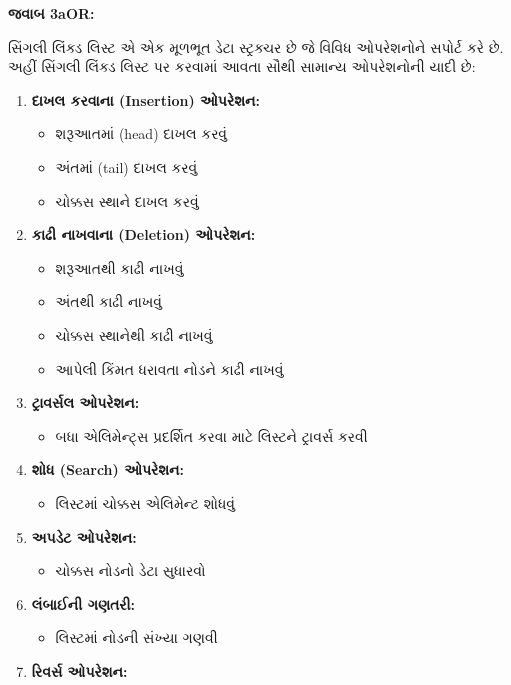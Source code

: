 \textbf{જવાબ 3aOR:}

સિંગલી લિંક્ડ લિસ્ટ એ એક મૂળભૂત ડેટા સ્ટ્રક્ચર છે જે વિવિધ ઓપરેશનોને સપોર્ટ કરે છે. અહીં
સિંગલી લિંક્ડ લિસ્ટ પર કરવામાં આવતા સૌથી સામાન્ય ઓપરેશનોની યાદી છે:

\begin{enumerate}
\def\labelenumi{\arabic{enumi}.}
\tightlist
\item
  \textbf{દાખલ કરવાના (Insertion) ઓપરેશન:}

  \begin{itemize}
  \tightlist
  \item
    શરૂઆતમાં (head) દાખલ કરવું
  \item
    અંતમાં (tail) દાખલ કરવું
  \item
    ચોક્કસ સ્થાને દાખલ કરવું
  \end{itemize}
\item
  \textbf{કાઢી નાખવાના (Deletion) ઓપરેશન:}

  \begin{itemize}
  \tightlist
  \item
    શરૂઆતથી કાઢી નાખવું
  \item
    અંતથી કાઢી નાખવું
  \item
    ચોક્કસ સ્થાનેથી કાઢી નાખવું
  \item
    આપેલી કિંમત ધરાવતા નોડને કાઢી નાખવું
  \end{itemize}
\item
  \textbf{ટ્રાવર્સલ ઓપરેશન:}

  \begin{itemize}
  \tightlist
  \item
    બધા એલિમેન્ટ્સ પ્રદર્શિત કરવા માટે લિસ્ટને ટ્રાવર્સ કરવી
  \end{itemize}
\item
  \textbf{શોધ (Search) ઓપરેશન:}

  \begin{itemize}
  \tightlist
  \item
    લિસ્ટમાં ચોક્કસ એલિમેન્ટ શોધવું
  \end{itemize}
\item
  \textbf{અપડેટ ઓપરેશન:}

  \begin{itemize}
  \tightlist
  \item
    ચોક્કસ નોડનો ડેટા સુધારવો
  \end{itemize}
\item
  \textbf{લંબાઈની ગણતરી:}

  \begin{itemize}
  \tightlist
  \item
    લિસ્ટમાં નોડની સંખ્યા ગણવી
  \end{itemize}
\item
  \textbf{રિવર્સ ઓપરેશન:}


\end{enumerate}
